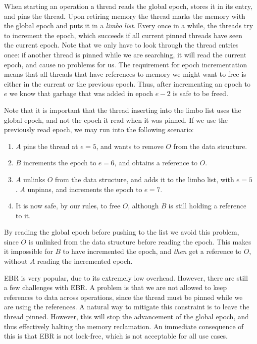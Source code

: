 When starting an operation a thread reads the global epoch, stores it in its entry, and pins the
thread. Upon retiring memory the thread marks the memory with the global epoch and puts it in a
\emph{limbo list}. Every once in a while, the threads try to increment the epoch, which succeeds if
all current pinned threads have seen the current epoch. Note that we only have to look through the
thread entries once: if another thread is pinned while we are searching, it will read the current
epoch, and cause no problems for us. The requirement for epoch incrementation means that all
threads that have references to memory we might want to free is either in the current or the
previous epoch. Thus, after incrementing an epoch to $e$ we know that garbage that was added in
epoch $e-2$ is safe to be freed.

Note that it is important that the thread inserting into the limbo list uses the global epoch, and
not the epoch it read when it was pinned. If we use the previously read epoch, we may run into the
following scenario: \begin{enumerate} \item $A$ pins the thread at $e=5$, and wants to remove $O$
from the data structure.  \item $B$ increments the epoch to $e=6$, and obtains a reference to $O$.
\item $A$ unlinks $O$ from the data structure, and adds it to the limbo list, with $e=5$. $A$
unpinns, and increments the epoch to $e=7$.  \item It is now safe, by our rules, to free $O$,
although $B$ is still holding a reference to it.  \end{enumerate} By reading the global epoch
before pushing to the list we avoid this problem, since $O$ is unlinked from the data structure
before reading the epoch. This makes it impossible for $B$ to have incremented the epoch, and
\emph{then} get a reference to $O$, without $A$ reading the incremented epoch.

EBR is very popular, due to its extremely low overhead.  However, there are still a few challenges
with EBR\@. A problem is that we are not allowed to keep references to data across operations,
since the thread must be pinned while we are using the references. A natural way to mitigate this
constraint is to leave the thread pinned. However, this will stop the advancement of the global
epoch, and thus effectively halting the memory reclamation. An immediate consequence of this is
that EBR is not lock-free, which is not acceptable for all use cases.

